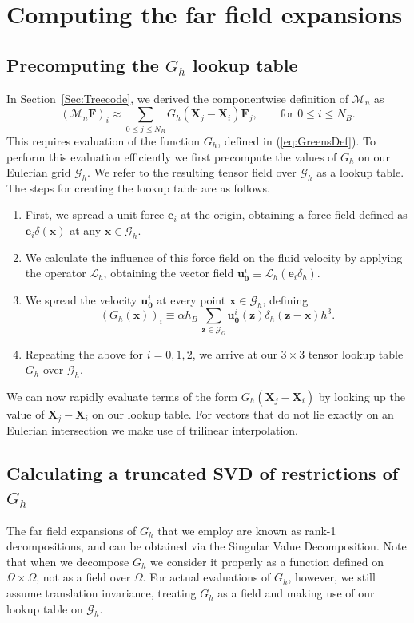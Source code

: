 \documentclass[preprint,12pt]{elsarticle}
\newcommand{\B}[1]{\mathbf{#1}}
\newcommand{\C}[1]{\mathcal{#1}}
\begin{document}
\section{Computing the far field expansions}
\label{Sec:Decomposition}

\subsection{Precomputing the $G_h$ lookup table}
In Section~\ref{Sec:Treecode}, we derived the componentwise definition of $\C{M}_n$ as 
\begin{equation}
(\C{M}_n\B{F})_i \approx \sum_{0\leq j\leq N_B} G_h(\B{X}_j - \B{X}_i) \B{F}_j, \qquad\text{for $0\leq i\leq N_B$}.
\end{equation}
This requires evaluation of the function $G_h$, defined in (\ref{eq:GreensDef}). To perform this evaluation efficiently we first precompute the values of $G_h$ on our Eulerian grid $\C{G}_h$. We refer to the resulting tensor field over $\C{G}_h$ as a lookup table. The steps for creating the lookup table are as follows.
\begin{enumerate}
\item
First, we spread a unit force $\B{e}_i$ at the origin, obtaining a force field defined as $\B{e}_i \delta(\B{x})$ at any $\B{x}\in\C{G}_h$.
\item
We calculate the influence of this force field on the fluid velocity by applying the operator $\C{L}_h$, obtaining the vector field $\B{u}_{\B{0}}^i \equiv \C{L}_h( \B{e}_i \delta_h )$.
\item
We spread the velocity $\B{u}_{\B{0}}^i$ at every point $\B{x}\in \C{G}_h$, defining
\begin{equation}
(G_h(\B{x}))_i \equiv \alpha h_B \, \sum_{\B{z} \in \C{G}_\Omega} \B{u}_{\B{0}}^i(\B{z}) \delta_h\left(\B{z}-\B{x}\right)h^3.
\end{equation}
\item
Repeating the above for $i=0,1,2$, we arrive at our $3\times 3$ tensor lookup table $G_h$ over $\C{G}_h$.
\end{enumerate}
We can now rapidly evaluate terms of the form $G_h(\B{X}_j - \B{X}_i)$ by looking up the value of $\B{X}_j - \B{X}_i$ on our lookup table. For vectors that do not lie exactly on an Eulerian intersection we make use of trilinear interpolation.

\subsection{Calculating a truncated SVD of restrictions of $G_h$}
The far field expansions of $G_h$ that we employ are known as rank-1 decompositions, and can be obtained via the Singular Value Decomposition. Note that when we decompose $G_h$ we consider it properly as a function defined on $\Omega \times \Omega$, not as a field over $\Omega$. For actual evaluations of $G_h$, however, we still assume translation invariance, treating $G_h$ as a field and making use of our lookup table on $\C{G}_h$.
\end{document}
